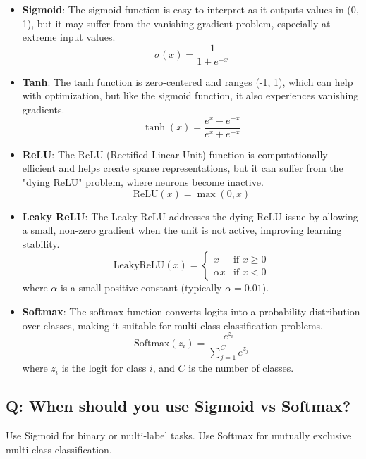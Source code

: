 \documentclass[11pt]{article}
\begin{document}
\begin{itemize}
	\item \textbf{Sigmoid}: The sigmoid function is easy to interpret as it outputs values in (0, 1), but it may suffer from the vanishing gradient problem, especially at extreme input values.
	      \[
		      \sigma(x) = \frac{1}{1 + e^{-x}}
	      \]

	\item \textbf{Tanh}: The tanh function is zero-centered and ranges (-1, 1), which can help with optimization, but like the sigmoid function, it also experiences vanishing gradients.
	      \[
		      \tanh(x) = \frac{e^x - e^{-x}}{e^x + e^{-x}}
	      \]

	\item \textbf{ReLU}: The ReLU (Rectified Linear Unit) function is computationally efficient and helps create sparse representations, but it can suffer from the "dying ReLU" problem, where neurons become inactive.
	      \[
		      \text{ReLU}(x) = \max(0, x)
	      \]

	\item \textbf{Leaky ReLU}: The Leaky ReLU addresses the dying ReLU issue by allowing a small, non-zero gradient when the unit is not active, improving learning stability.
	      \[
		      \text{LeakyReLU}(x) =
		      \begin{cases}
			      x        & \text{if } x \geq 0 \\
			      \alpha x & \text{if } x < 0
		      \end{cases}
	      \]
	      where \( \alpha \) is a small positive constant (typically \( \alpha = 0.01 \)).

	\item \textbf{Softmax}: The softmax function converts logits into a probability distribution over classes, making it suitable for multi-class classification problems.
	      \[
		      \text{Softmax}(z_i) = \frac{e^{z_i}}{\sum_{j=1}^{C} e^{z_j}}
	      \]
	      where \( z_i \) is the logit for class \( i \), and \( C \) is the number of classes.
\end{itemize}

\subsection*{Q: When should you use Sigmoid vs Softmax?}
Use Sigmoid for binary or multi-label tasks. Use Softmax for mutually exclusive multi-class classification.
\end{document}
